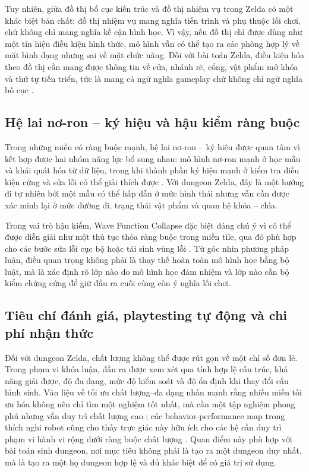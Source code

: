 \documentclass[oneside,a4paper,12pt]{extreport}
\begin{document}
Tuy nhiên, giữa đồ thị bố cục kiến trúc và đồ thị nhiệm vụ trong Zelda có một khác biệt bản chất: đồ thị nhiệm vụ mang nghĩa tiến trình và phụ thuộc lối chơi, chứ không chỉ mang nghĩa kề cận hình học. Vì vậy, nếu đồ thị chỉ được dùng như một tín hiệu điều kiện hình thức, mô hình vẫn có thể tạo ra các phòng hợp lý về mặt hình dạng nhưng sai về mặt chức năng. Đối với bài toán Zelda, điều kiện hóa theo đồ thị cần mang được thông tin về cửa, nhánh rẽ, cổng, vật phẩm mở khóa và thứ tự tiến triển, tức là mang cả ngữ nghĩa gameplay chứ không chỉ ngữ nghĩa bố cục \cite{dormans2011missionspaces,mota2021dungeon,madkour2021guidinggg}.

\subsection{Hệ lai nơ-ron -- ký hiệu và hậu kiểm ràng buộc}
Trong những miền có ràng buộc mạnh, hệ lai nơ-ron -- ký hiệu được quan tâm vì kết hợp được hai nhóm năng lực bổ sung nhau: mô hình nơ-ron mạnh ở học mẫu và khái quát hóa từ dữ liệu, trong khi thành phần ký hiệu mạnh ở kiểm tra điều kiện cứng và sửa lỗi có thể giải thích được \cite{besold2017neuralsymbolic,garcez2019neuralsymbolic,cunnington2023ffnsl,dormans2011missionspaces,rodriguez2019bootstrapping}. Với dungeon Zelda, đây là một hướng đi tự nhiên bởi một mẫu có thể hấp dẫn ở mức hình thái nhưng vẫn cần được xác minh lại ở mức đường đi, trạng thái vật phẩm và quan hệ khóa -- chìa.

Trong vai trò hậu kiểm, Wave Function Collapse đặc biệt đáng chú ý vì có thể được diễn giải như một thủ tục thỏa ràng buộc trong miền tile, qua đó phù hợp cho các bước sửa lỗi cục bộ hoặc tái sinh vùng lỗi \cite{karth2021wfc}. Từ góc nhìn phương pháp luận, điều quan trọng không phải là thay thế hoàn toàn mô hình học bằng bộ luật, mà là xác định rõ lớp nào do mô hình học đảm nhiệm và lớp nào cần bộ kiểm chứng cứng để giữ đầu ra cuối cùng còn ý nghĩa lối chơi.

\subsection{Tiêu chí đánh giá, playtesting tự động và chi phí nhận thức}
Đối với dungeon Zelda, chất lượng không thể được rút gọn về một chỉ số đơn lẻ. Trong phạm vi khóa luận, đầu ra được xem xét qua tính hợp lệ cấu trúc, khả năng giải được, độ đa dạng, mức độ kiểm soát và độ ổn định khi thay đổi cấu hình sinh. Văn liệu về tối ưu chất lượng--đa dạng nhấn mạnh rằng nhiều miền tối ưu hóa không nên chỉ tìm một nghiệm tốt nhất, mà cần một tập nghiệm phong phú nhưng vẫn duy trì chất lượng cao \cite{mouret2015mapelites,pugh2016quality,vassiliades2017cvt,fontaine2020cma,gravina2019pcgqd}; các behavior-performance map trong thích nghi robot cũng cho thấy trực giác này hữu ích cho các hệ cần duy trì phạm vi hành vi rộng dưới ràng buộc chất lượng \cite{cully2015robots}. Quan điểm này phù hợp với bài toán sinh dungeon, nơi mục tiêu không phải là tạo ra một dungeon duy nhất, mà là tạo ra một họ dungeon hợp lệ và đủ khác biệt để có giá trị sử dụng.
\end{document}
